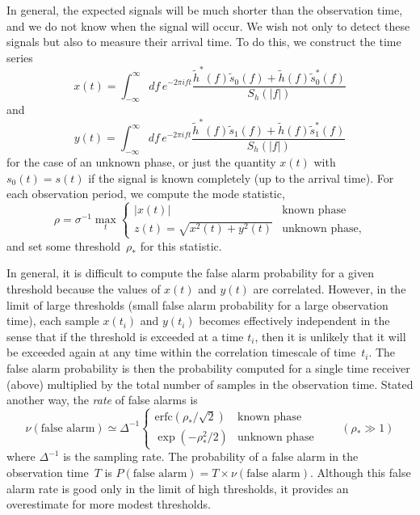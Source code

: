 In general, the expected signals will be much shorter than the
observation time, and we do not know when the signal will occur.
We wish not only to detect these signals but also to measure their
arrival time.  To do this, we construct the time series
\begin{equation}
  x(t) = \int_{-\infty}^\infty df\,e^{-2\pi ift}
  \frac{\tilde{h}^\ast(f)\tilde{s}_0(f)+\tilde{h}(f)\tilde{s}_0^\ast(f)}
       {S_h(|f|)}
  \label{e:cfcorr}
\end{equation}
and
\begin{equation}
  y(t) = \int_{-\infty}^\infty df\,e^{-2\pi ift}
  \frac{\tilde{h}^\ast(f)\tilde{s}_1(f)+\tilde{h}(f)\tilde{s}_1^\ast(f)}
       {S_h(|f|)}
\end{equation}
for the case of an unknown phase, or just the quantity $x(t)$
with $s_0(t)=s(t)$ if the signal is known completely (up to the
arrival time).  For each observation period, we compute the mode
statistic,
\begin{equation}
  \rho = \sigma^{-1}\max_t\left\{
  \begin{array}{ll}
    |x(t)| & \mbox{known phase} \\[6pt]
    z(t)=\sqrt{x^2(t)+y^2(t)} & \mbox{unknown phase},
  \end{array}
  \right.
\end{equation}
and set some threshold~$\rho_\ast$ for this statistic.

In general, it is difficult to compute the false alarm probability for
a given threshold because the values of $x(t)$ and $y(t)$ are correlated.
However, in the limit of large thresholds (small false alarm probability
for a large observation time), each sample $x(t_i)$ and $y(t_i)$ becomes
effectively independent in the sense that if the threshold is exceeded
at a time $t_i$, then it is unlikely that it will be exceeded again at
any time within the correlation timescale of time~$t_i$.  The false
alarm probability is then the probability computed for a single time
receiver (above) multiplied by the total number of samples in the
observation time.  Stated another way, the \emph{rate} of false alarms is
\begin{equation}
  \nu(\mbox{false alarm}) \simeq \Delta^{-1} \left\{
  \begin{array}{ll}
    {\mathrm{erfc}}(\rho_\ast/\surd2) & \mbox{known phase} \\[6pt]
    \exp(-\rho_\ast^2/2)              & \mbox{unknown phase}
  \end{array}
  \right. \qquad (\rho_\ast\gg1)
\end{equation}
where $\Delta^{-1}$ is the sampling rate.  The probability of a
false alarm in the observation time~$T$
is $P(\mbox{false alarm})=T\times\nu(\mbox{false alarm})$.  Although
this false alarm rate is good only in the limit of high thresholds,
it provides an overestimate for more modest thresholds.

